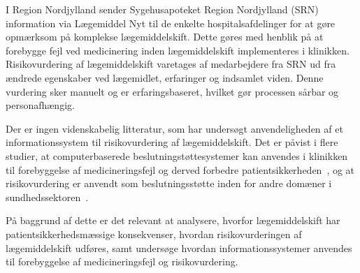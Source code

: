 I Region Nordjylland sender Sygehusapoteket Region Nordjylland (SRN) information via Lægemiddel Nyt til de enkelte hospitalsafdelinger for at gøre opmærksom på komplekse lægemiddelskift. Dette gøres med henblik på at forebygge fejl ved medicinering inden lægemiddelskift implementeres i klinikken. Risikovurdering af lægemiddelskift varetages af medarbejdere fra SRN ud fra ændrede egenskaber ved lægemidlet, erfaringer og indsamlet viden. Denne vurdering sker manuelt og er erfaringsbaseret, hvilket gør processen sårbar og personafhængig.

Der er ingen videnskabelig litteratur, som har undersøgt anvendeligheden af et informationssystem til risikovurdering af lægemiddelskift. 
Det er påvist i flere studier, at computerbaserede beslutningstøttesystemer kan anvendes i klinikken til forebyggelse af medicineringsfejl og derved forbedre patientsikkerheden~\citep{Agrawal2009, Stenner2010, Fischer2008, Simpson2008}, og at risikovurdering er anvendt som beslutningsstøtte inden for andre domæner i sundhedssektoren~\citep{Geissert2018, Rawshani2018}. 

På baggrund af dette er det relevant at analysere, hvorfor lægemiddelskift har patientsikkerhedsmæssige konsekvenser, hvordan risikovurderingen af lægemiddelskift udføres, samt undersøge hvordan informationssystemer anvendes til forebyggelse af medicineringsfejl og risikovurdering.
